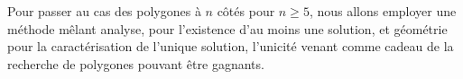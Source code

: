 Pour passer au cas des polygones à $n$ côtés pour $n \geq 5$, nous allons employer une méthode mêlant analyse, pour l'existence d'au moins une solution, et géométrie pour la caractérisation de l'unique solution, l'unicité venant comme cadeau de la recherche de polygones pouvant être gagnants.
